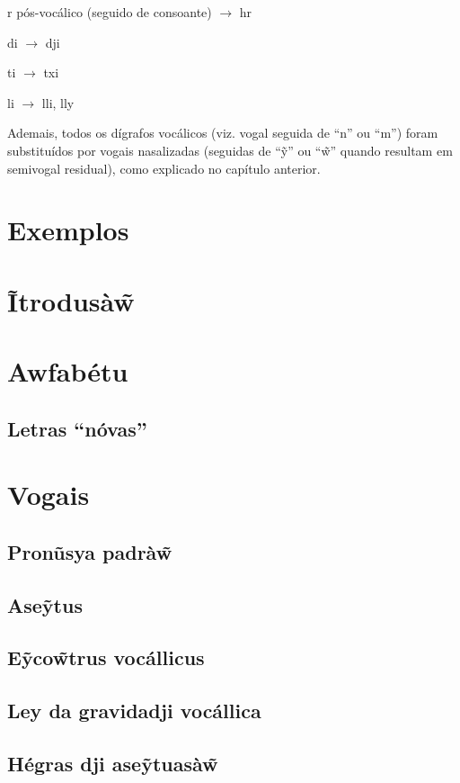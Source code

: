 \documentclass[12pt, a5paper, titlepage]{article}
\begin{document}
\begin{bilingualpages}
    r pós-vocálico (seguido de consoante) $\rightarrow$ hr

    di $\rightarrow$ dji
    
    ti $\rightarrow$ txi

    li $\rightarrow$ lli, lly

    Ademais, todos os dígrafos vocálicos (viz. vogal seguida de ``n'' ou ``m'') foram substituídos por vogais nasalizadas (seguidas de ``\~y'' ou ``\~w'' quando resultam em semivogal residual), como explicado no capítulo anterior.
    
    \section{Exemplos}
    
    \leftpage
    \section{Ĩtrodusà\~{w}}
    
    \newpage
    \section{Awfabétu}
    \BrTableAbc

    \subsection{Letras ``nóvas''}
    
    \section{Vogais}
    \subsection{Pronũsya padrà\~w}
    \subsection{Ase\~ytus}
    \subsection{E\~yco\~wtrus vocállicus}
    \subsection{Ley da gravidadji vocállica}
    \subsection{Hégras dji ase\~ytuasà\~w}


\end{bilingualpages}
\end{document}
